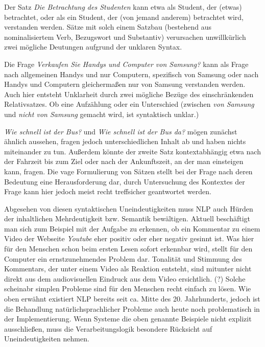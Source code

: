 \documentclass[12pt]{report}
\begin{document}
Der Satz \textit{\glqq   Die Betrachtung des Studenten\grqq{}} kann etwa als Student, der (etwas) betrachtet, oder als ein Student, der (von jemand anderem) betrachtet wird, verstanden werden. Sätze mit solch einem Satzbau (bestehend aus nominalisiertem Verb, Bezugswort und Substantiv) verursachen unwillkürlich zwei mögliche Deutungen aufgrund der unklaren Syntax.

Die Frage \textit{\glqq  Verkaufen Sie Handys und Computer von Samsung?\grqq{}} kann als Frage nach allgemeinen Handys und nur Computern, spezifisch von Samsung oder nach Handys und Computern gleichermaßen nur von Samsung verstanden werden. Auch hier entsteht Unklarheit durch zwei mögliche Bezüge des einschränkenden Relativsatzes. Ob eine Aufzählung oder ein Unterschied (zwischen \textit{von Samsung} und \textit{nicht von Samsung} gemacht wird, ist syntaktisch unklar.)

\textit{\glqq  Wie schnell ist der Bus?\grqq{}} und \textit{\glqq  Wie schnell ist der Bus da?\grqq{}} mögen zunächst ähnlich aussehen, fragen jedoch unterschiedlichen Inhalt ab und haben nichts miteinander zu tun. Außerdem könnte der zweite Satz kontextabhängig etwa nach der Fahrzeit bis zum Ziel oder nach der Ankunftszeit, an der man einsteigen kann, fragen. Die vage Formulierung von Sätzen stellt bei der Frage nach deren Bedeutung eine Herausforderung dar, durch Untersuchung des Kontextes der Frage kann hier jedoch meist recht treffsicher geantwortet werden.

Abgesehen von diesen syntaktischen Uneindeutigkeiten muss NLP auch Hürden der inhaltlichen Mehrdeutigkeit bzw. Semantik bewältigen. Aktuell beschäftigt man sich zum Beispiel mit der Aufgabe zu erkennen, ob ein Kommentar zu einem Video der Webseite \textit{Youtube} eher positiv oder eher negativ gesinnt ist. Was hier für den Menschen schon beim ersten Lesen sofort erkennbar wird, stellt für den Computer ein ernstzunehmendes Problem dar. Tonalität und Stimmung des Kommentars, der unter einem Video als Reaktion entsteht, sind mitunter nicht direkt aus dem audiovisuellen Eindruck aus dem Video ersichtlich. (?)
Solche scheinabr simplen Probleme sind für den Menschen recht einfach zu lösen. Wie oben erwähnt existiert NLP bereits seit ca. Mitte des 20. Jahrhunderts, jedoch ist die Behandlung natürlichsprachlicher Probleme auch heute noch problematisch in der Implementierung. Wenn Systeme die oben genannte Beispiele nicht explizit ausschließen, muss die Verarbeitungslogik besondere Rücksicht auf Uneindeutigkeiten nehmen.
\end{document}
